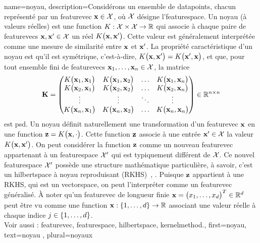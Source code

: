 {name={noyau}, 
	description={Considérons un ensemble de \glspl{datapoint}, chacun représenté par un \gls{featurevec} 
		${\bf x} \in \mathcal{X}$, où $\mathcal{X}$ désigne l’\gls{featurespace}. 
		Un noyau (à valeurs réelles) est une \gls{function} 
		$K: \mathcal{X} \times \mathcal{X} \rightarrow \mathbb{R}$ qui associe à chaque paire de 
		\glspl{featurevec} ${\bf x}, {\bf x}' \in \mathcal{X}$ un réel $K\big({\bf x},{\bf x}'\big)$. 
		Cette valeur est généralement interprétée comme une mesure de similarité entre ${\bf x}$ et ${\bf x}'$. 
		La propriété caractéristique d’un noyau est qu’il est symétrique, c’est-à-dire, 
		$K\big({\bf x},{\bf x}'\big) = K\big({\bf x}',{\bf x}\big)$, et que, 
		pour tout ensemble fini de \glspl{featurevec} ${\bf x}_1, \ldots, {\bf x}_n \in \mathcal{X}$, la matrice 
		\begin{equation}
			\nonumber
			\mathbf{K} = \begin{pmatrix}
				K\big({\bf x}_1,{\bf x}_1\big) & K\big({\bf x}_1,{\bf x}_2\big) & \ldots & K\big({\bf x}_1,{\bf x}_n\big) \\
				K\big({\bf x}_2,{\bf x}_1\big) & K\big({\bf x}_2,{\bf x}_2\big) & \ldots & K\big({\bf x}_2,{\bf x}_n\big) \\
				\vdots											
				& \vdots & \ddots & \vdots \\
				K\big({\bf x}_n,{\bf x}_1\big) & K\big({\bf x}_n,{\bf x}_2\big) & \ldots & K\big({\bf x}_n,{\bf x}_n\big) 
			\end{pmatrix} \in \mathbb{R}^{n \times n}
		\end{equation}
		est \gls{psd}. 
		Un noyau définit naturellement une transformation d’un \gls{featurevec} ${\bf x}$ en une 
		\gls{function} ${\bf z} = K\big({\bf x},\cdot\big)$. Cette \gls{function} ${\bf z}$ associe à une 
		entrée ${\bf x}' \in \mathcal{X}$ la valeur $K\big({\bf x},{\bf x}'\big)$. 
		On peut considérer la \gls{function} ${\bf z}$ comme un nouveau \gls{featurevec} appartenant à un 
		\gls{featurespace} $\mathcal{X}'$ qui est typiquement différent de $\mathcal{X}$. 
		Ce nouvel \gls{featurespace} $\mathcal{X}'$ possède une structure mathématique particulière, à savoir, c’est un \gls{hilbertspace} à noyau reproduisant (RKHS)~\cite{LearningKernelsBook}, \cite{LampertNowKernel}.
		Puisque ${\bf z}$ appartient à une RKHS, qui est un \gls{vectorspace}, on peut l’interpréter comme un 
		\gls{featurevec} généralisé. À noter qu’un \gls{featurevec} de longueur finie 
		${\bf x}=\big(x_{1},\ldots,x_{d} \big)^{T} \in \mathbb{R}^{d}$ 
		peut être vu comme une \gls{function} ${\bf x}: \{1, \ldots, d\} \rightarrow \mathbb{R}$ 
		associant une valeur réelle à chaque indice $j \in \{1,\ldots,d\}$.
		\\
		Voir aussi : \gls{featurevec}, \gls{featurespace}, \gls{hilbertspace}, \gls{kernelmethod}.},
	first={noyau},
	text={noyau} , plural={noyaux}
}

